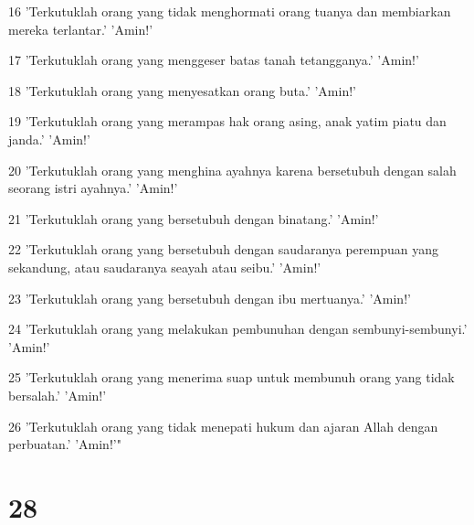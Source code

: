 \par 16 'Terkutuklah orang yang tidak menghormati orang tuanya dan membiarkan mereka terlantar.' 'Amin!'
\par 17 'Terkutuklah orang yang menggeser batas tanah tetangganya.' 'Amin!'
\par 18 'Terkutuklah orang yang menyesatkan orang buta.' 'Amin!'
\par 19 'Terkutuklah orang yang merampas hak orang asing, anak yatim piatu dan janda.' 'Amin!'
\par 20 'Terkutuklah orang yang menghina ayahnya karena bersetubuh dengan salah seorang istri ayahnya.' 'Amin!'
\par 21 'Terkutuklah orang yang bersetubuh dengan binatang.' 'Amin!'
\par 22 'Terkutuklah orang yang bersetubuh dengan saudaranya perempuan yang sekandung, atau saudaranya seayah atau seibu.' 'Amin!'
\par 23 'Terkutuklah orang yang bersetubuh dengan ibu mertuanya.' 'Amin!'
\par 24 'Terkutuklah orang yang melakukan pembunuhan dengan sembunyi-sembunyi.' 'Amin!'
\par 25 'Terkutuklah orang yang menerima suap untuk membunuh orang yang tidak bersalah.' 'Amin!'
\par 26 'Terkutuklah orang yang tidak menepati hukum dan ajaran Allah dengan perbuatan.' 'Amin!'"

\chapter{28}

